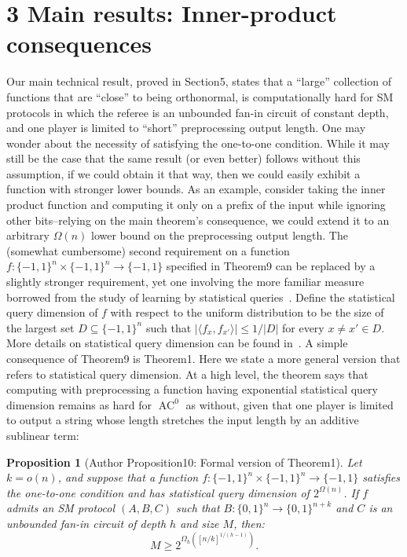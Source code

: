 \documentclass[10pt,a4paper]{article}
\newtheorem{ntproposition}[nttheorem]{Proposition}
\begin{document}
\section*{3 Main results: Inner-product consequences}
Our main technical result, proved in Section5, states that a ``large'' collection of functions that are ``close'' to being orthonormal, is computationally hard for SM protocols in which the referee is an unbounded fan-in circuit of constant depth, and one player is limited to ``short'' preprocessing output length.
One may wonder about the necessity of satisfying the one-to-one condition. While it may still be the case that the same result (or even better) follows without this assumption, if we could obtain it that way, then we could easily exhibit a function with stronger lower bounds. As an example, consider taking the inner product function and computing it only on a prefix of the input while ignoring other bits--relying on the main theorem's consequence, we could extend it to an arbitrary $\Omega(n)$ lower bound on the preprocessing output length.
The (somewhat cumbersome) second requirement on a function $f:\{-1,1\}^n\times\{-1,1\}^n\to\{-1,1\}$ specified in Theorem9 can be replaced by a slightly stronger requirement, yet one involving the more familiar measure borrowed from the study of learning by statistical queries~\cite{ref23}. Define the statistical query dimension of $f$ with respect to the uniform distribution to be the size of the largest set $D\subseteq\{-1,1\}^n$ such that $|\langle f_x,f_{x'}\rangle|\leq1/|D|$ for every $x\ne x'\in D$. More details on statistical query dimension can be found in~\cite{ref7}.
A simple consequence of Theorem9 is Theorem1. Here we state a more general version that refers to statistical query dimension. At a high level, the theorem says that computing with preprocessing a function having exponential statistical query dimension remains as hard for $\operatorname{AC}^0$ as without, given that one player is limited to output a string whose length stretches the input length by an additive sublinear term:
\setcounter{nttheorem}{9}
\begin{ntproposition}[Author Proposition10: Formal version of Theorem1]
Let $k=o(n)$, and suppose that a function $f:\{-1,1\}^n\times\{-1,1\}^n\to\{-1,1\}$ satisfies the one-to-one condition and has statistical query dimension of $2^{\Omega(n)}$. If $f$ admits an SM protocol $(A,B,C)$ such that $B:\{0,1\}^n\to\{0,1\}^{n+k}$ and $C$ is an unbounded fan-in circuit of depth $h$ and size $M$, then:
\[M\geq2^{\Omega_h([n/k]^{1/(h-1)})}.\]
\end{ntproposition}
\end{document}
